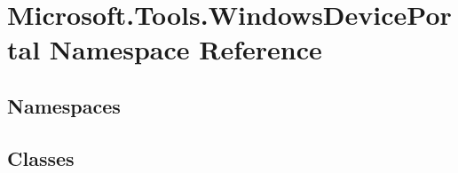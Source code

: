 \hypertarget{namespace_microsoft_1_1_tools_1_1_windows_device_portal}{}\section{Microsoft.\+Tools.\+Windows\+Device\+Portal Namespace Reference}
\label{namespace_microsoft_1_1_tools_1_1_windows_device_portal}
\subsection*{Namespaces}
\begin{DoxyCompactItemize}
\end{DoxyCompactItemize}
\subsection*{Classes}
